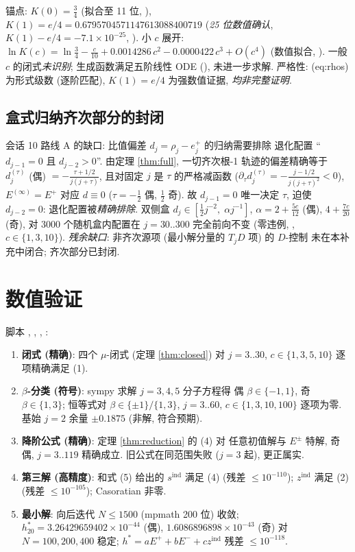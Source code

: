 \documentclass[UTF8]{ctexart}
\begin{document}
锚点: $K(0) = \tfrac34$ (拟合至 11 位, ),
$K(1) = e/4 = 0.6795704571147613088400719$ (\emph{25 位数值确认},
$K(1) - e/4 = -7.1 \times 10^{-25}$, ).
小 $c$ 展开: $\ln K(c) = \ln\tfrac34 - \tfrac{c}{10}
+ 0.0014286\,c^2 - 0.0000422\,c^3 + O(c^4)$
(数值拟合, ). 一般 $c$ 的闭式\emph{未识别};
生成函数满足五阶线性 ODE (), 未进一步求解.
严格性: (eq:rhos) 为形式级数 (逐阶匹配), $K(1) = e/4$ 为强数值证据,
\emph{均非完整证明}.

\subsection{盒式归纳齐次部分的封闭}\label{sec:box}

会话 10 路线 A 的缺口: 比值偏差 $d_j = \rho_j - e^+_j$ 的归纳需要排除
退化配置 ``$d_{j-1} = 0$ 且 $d_{j-2} > 0$''. 由定理 \ref{thm:full},
一切齐次根-1 轨迹的偏差精确等于 $d^{(\tau)}_j$ (偶)
$= -\frac{\tau+1/2}{j(j+\tau)}$, 且对固定 $j$ 是 $\tau$ 的严格减函数
($\partial_\tau d^{(\tau)}_j = -\frac{j-1/2}{j(j+\tau)^2} < 0$),
$E^{(\infty)} = E^+$ 对应 $d \equiv 0$ ($\tau = -\tfrac12$ 偶,
$\tfrac12$ 奇). 故 $d_{j-1} = 0$ 唯一决定 $\tau$, 迫使
$d_{j-2} = 0$: 退化配置被\emph{精确排除}. 双侧盒
$d_j \in [\tfrac12 j^{-2},\; \alpha j^{-1}]$,
$\alpha = 2 + \tfrac{5c}{12}$ (偶), $4 + \tfrac{7c}{20}$ (奇),
对 3000 个随机盒内配置在 $j = 30..300$ 完全前向不变 (零违例,
, $c \in \{1,3,10\}$).
\emph{残余缺口}: 非齐次源项 (最小解分量的 $T_j D$ 项) 的 $D$-控制
未在本补充中闭合; 齐次部分已封闭.

\section{数值验证}

脚本 , ,
, :
\begin{enumerate}
	\item \textbf{闭式 (精确)}: 四个 $\mu$-闭式 (定理 \ref{thm:closed}) 对
		$j = 3..30$, $c \in \{1,3,5,10\}$ 逐项精确满足 (1).
	\item \textbf{$\beta$-分类 (符号)}: sympy 求解 $j = 3,4,5$ 分子方程得
		偶 $\beta \in \{-1,1\}$, 奇 $\beta \in \{1,3\}$; 恒等式对
		$\beta \in \{\pm 1\}/\{1,3\}$, $j = 3..60$, $c \in \{1,3,10,100\}$
		逐项为零. 基始 $j=2$ 余量 $\pm 0.1875$ (非解, 符合预期).
	\item \textbf{降阶公式 (精确)}: 定理 \ref{thm:reduction} 的 (4) 对
		任意初值解与 $E^\pm$ 特解, 奇偶, $j = 3..119$ 精确成立.
		旧公式在同范围失败 ($j=3$ 起), 更正属实.
	\item \textbf{第三解 (高精度)}: 和式 (5) 给出的 $s^{\mathrm{ind}}$ 满足 (4)
		(残差 $\leq 10^{-110}$); $z^{\mathrm{ind}}$ 满足 (2) (残差
		$\leq 10^{-105}$); Casoratian 非零.
	\item \textbf{最小解}: 向后迭代 $N \leq 1500$ (mpmath 200 位) 收敛;
		$h^*_{20} = 3.26429659402\times10^{-44}$ (偶), $1.6086896898\times10^{-43}$
		(奇) 对 $N = 100,200,400$ 稳定; $h^* = aE^+ + bE^- + c z^{\mathrm{ind}}$
		残差 $\leq 10^{-118}$.
\end{enumerate}
\end{document}
